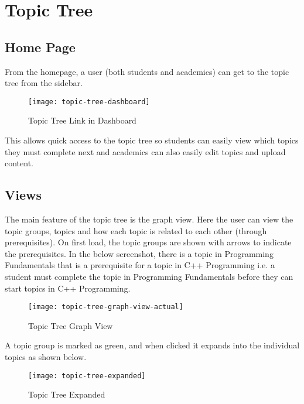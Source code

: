 \section{Topic Tree}

\subsection{Home Page}

From the homepage, a user (both students and academics) can get to the topic tree from the sidebar.\\

\begin{figure}[h!]
    \centering
    \texttt{[image: topic-tree-dashboard]}
    \caption{Topic Tree Link in Dashboard}
\end{figure}

This allows quick access to the topic tree so students can easily view which topics they must complete next and academics can also easily edit topics and upload content.\\

\subsection{Views}

The main feature of the topic tree is the graph view. Here the user can view the topic groups, topics and how each topic is related to each other (through prerequisites). On first load, the topic groups are shown with arrows to indicate the prerequisites. In the below screenshot, there is a topic in Programming Fundamentals that is a prerequisite for a topic in C++ Programming i.e. a student must complete the topic in Programming Fundamentals before they can start topics in C++ Programming.\\

\begin{figure}[h!]
    \centering
    \texttt{[image: topic-tree-graph-view-actual]}
    \caption{Topic Tree Graph View}
\end{figure}

A topic group is marked as green, and when clicked it expands into the individual topics as shown below. \\

\begin{figure}[h!]
    \centering
    \texttt{[image: topic-tree-expanded]}
    \caption{Topic Tree Expanded}
\end{figure}


